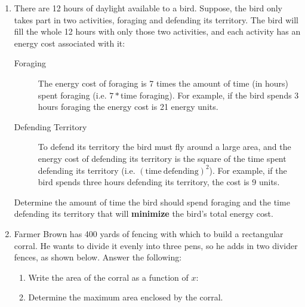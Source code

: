 \begin{enumerate}
\item There are 12 hours of daylight available to a
  bird. Suppose, the bird only takes part in two activities, foraging
  and defending its territory. The bird will fill the whole 12 hours
  with only those two activities, and each activity has an energy cost
  associated with it:
  \begin{description}
  \item[Foraging] The energy cost of foraging is 7 times the amount of
    time (in hours) spent foraging (i.e. $7*$time foraging). For
    example, if the bird spends 3 hours foraging the energy cost is 21
    energy units.
  \item[Defending Territory] To defend its territory the bird must fly
    around a large area, and the energy cost of defending its
    territory is the square of the time spent defending its territory
    (i.e. $(\mathrm{time~defending})^2$). For example, if the bird
    spends three hours defending its territory, the cost is 9 units.
  \end{description}
  
  Determine the amount of time the bird should spend foraging and the
  time defending its territory that will \textbf{minimize} the bird's
  total energy cost.


\item Farmer Brown has 400 yards of fencing with which to build a
  rectangular corral. He wants to divide it evenly into three pens, so
  he adds in two divider fences, as shown below. Answer the following:


\begin{enumerate}
\item Write the area of the corral as a function of $x$: 
\item Determine the maximum area enclosed by the corral.
\end{enumerate}

\vfill

  
\end{enumerate}
